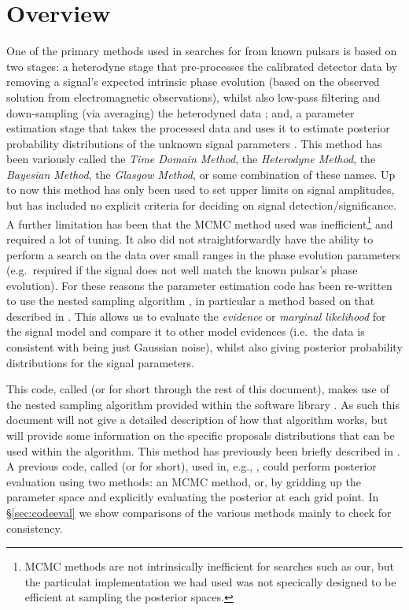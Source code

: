 \section{Overview}

One of the primary methods used in searches for \gws from known pulsars is based on two stages: a heterodyne
stage that pre-processes the calibrated \gw detector data by removing a signal's expected intrinsic phase
evolution (based on the observed solution from electromagnetic observations), whilst also low-pass filtering and
down-sampling (via averaging) the heterodyned data \citep{2005PhRvD..72j2002D}; and, a parameter estimation stage that takes the
processed data and uses it to estimate posterior probability distributions of the unknown signal parameters
\citep[e.g., using a Markov chain Monte Carlo (MCMC)][]{2010ApJ...713..671A}. This method has been variously
called the {\it Time Domain Method}, the {\it Heterodyne Method}, the {\it Bayesian Method}, the {\it Glasgow
Method}, or some combination of these names. Up to now this method has only been used to set upper limits
on signal amplitudes, but has included no explicit criteria for deciding on signal detection/significance. A further
limitation has been that the MCMC method used was inefficient\footnote{MCMC methods are not intrinsically inefficient for
searches such as our, but the particulat implementation we had used was not specically designed to be efficient at sampling the
posterior spaces.} and required a lot of tuning. It also
did not straightforwardly have the ability to perform a search on the data over small ranges in the phase
evolution parameters (e.g.\ required if the
\gw signal does not well match the known pulsar's phase evolution). For these reasons the parameter
estimation code has been re-written to use the nested sampling algorithm \citep{Skilling:2006}, in particular
a method based on that described in \citet{Veitch:2010}. This allows us to evaluate the {\it evidence} or {\it
marginal likelihood} for the signal model and compare it to other model evidences (i.e.\ the data is consistent with being just
Gaussian noise), whilst also giving posterior probability distributions for the signal parameters.

This code, called \lppenf (or \lppen for short through the rest of this document), makes use of the nested sampling
algorithm provided within the \lalinf software library \citep{2015PhRvD..91d2003V}. As such this document will not
give a detailed description of how that algorithm works, but will provide some information on the specific proposals
distributions that can be used within the algorithm. This method has previously been briefly described in \citet{2012JPhCS.363a2041P}.
A previous code, called \lppef (or \lppe for short), used in, e.g., \citet{2010ApJ...713..671A}, could perform posterior evaluation
using two methods: an MCMC method, or, by gridding up the parameter space and explicitly evaluating the posterior at each
grid point. In \S\ref{sec:codeeval} we show comparisons of the various methods mainly to check \lppen for consistency.

